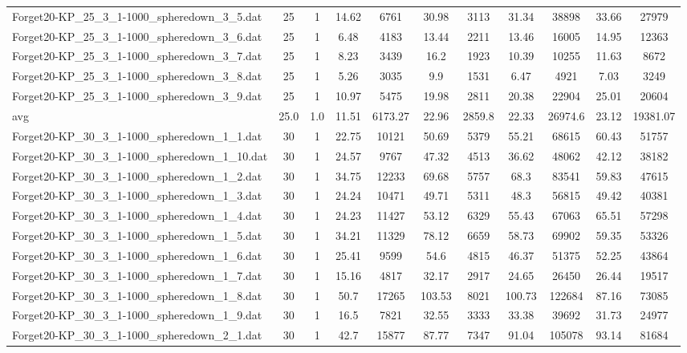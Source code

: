 \begin{table}[!ht]
\begin{tabular}{lcccccccccc}
Forget20-KP\_25\_3\_1-1000\_spheredown\_3\_5.dat & 25 & 1 & 14.62 & 6761 & 30.98 & 3113 & 31.34 & 38898 & 33.66 & 27979 \\
Forget20-KP\_25\_3\_1-1000\_spheredown\_3\_6.dat & 25 & 1 & 6.48 & 4183 & 13.44 & 2211 & 13.46 & 16005 & 14.95 & 12363 \\
Forget20-KP\_25\_3\_1-1000\_spheredown\_3\_7.dat & 25 & 1 & 8.23 & 3439 & 16.2 & 1923 & 10.39 & 10255 & 11.63 & 8672 \\
Forget20-KP\_25\_3\_1-1000\_spheredown\_3\_8.dat & 25 & 1 & 5.26 & 3035 & 9.9 & 1531 & 6.47 & 4921 & 7.03 & 3249 \\
Forget20-KP\_25\_3\_1-1000\_spheredown\_3\_9.dat & 25 & 1 & 10.97 & 5475 & 19.98 & 2811 & 20.38 & 22904 & 25.01 & 20604 \\
\hline avg & 25.0 & 1.0 & 11.51& 6173.27 & 22.96& 2859.8 & 22.33& 26974.6 & 23.12& 19381.07\\ \hline
Forget20-KP\_30\_3\_1-1000\_spheredown\_1\_1.dat & 30 & 1 & 22.75 & 10121 & 50.69 & 5379 & 55.21 & 68615 & 60.43 & 51757 \\
Forget20-KP\_30\_3\_1-1000\_spheredown\_1\_10.dat & 30 & 1 & 24.57 & 9767 & 47.32 & 4513 & 36.62 & 48062 & 42.12 & 38182 \\
Forget20-KP\_30\_3\_1-1000\_spheredown\_1\_2.dat & 30 & 1 & 34.75 & 12233 & 69.68 & 5757 & 68.3 & 83541 & 59.83 & 47615 \\
Forget20-KP\_30\_3\_1-1000\_spheredown\_1\_3.dat & 30 & 1 & 24.24 & 10471 & 49.71 & 5311 & 48.3 & 56815 & 49.42 & 40381 \\
Forget20-KP\_30\_3\_1-1000\_spheredown\_1\_4.dat & 30 & 1 & 24.23 & 11427 & 53.12 & 6329 & 55.43 & 67063 & 65.51 & 57298 \\
Forget20-KP\_30\_3\_1-1000\_spheredown\_1\_5.dat & 30 & 1 & 34.21 & 11329 & 78.12 & 6659 & 58.73 & 69902 & 59.35 & 53326 \\
Forget20-KP\_30\_3\_1-1000\_spheredown\_1\_6.dat & 30 & 1 & 25.41 & 9599 & 54.6 & 4815 & 46.37 & 51375 & 52.25 & 43864 \\
Forget20-KP\_30\_3\_1-1000\_spheredown\_1\_7.dat & 30 & 1 & 15.16 & 4817 & 32.17 & 2917 & 24.65 & 26450 & 26.44 & 19517 \\
Forget20-KP\_30\_3\_1-1000\_spheredown\_1\_8.dat & 30 & 1 & 50.7 & 17265 & 103.53 & 8021 & 100.73 & 122684 & 87.16 & 73085 \\
Forget20-KP\_30\_3\_1-1000\_spheredown\_1\_9.dat & 30 & 1 & 16.5 & 7821 & 32.55 & 3333 & 33.38 & 39692 & 31.73 & 24977 \\
Forget20-KP\_30\_3\_1-1000\_spheredown\_2\_1.dat & 30 & 1 & 42.7 & 15877 & 87.77 & 7347 & 91.04 & 105078 & 93.14 & 81684 \\

\end{tabular}
\end{table}
